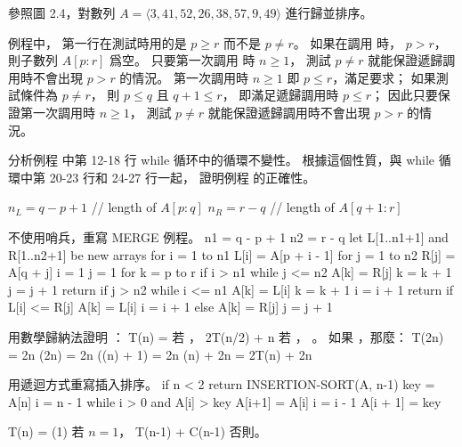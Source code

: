 \startsection[
  title={Designing algorithms},
]

\startEXERCISE
參照圖 2.4，對數列 $A=\langle 3,41,52,26,38,57,9,49\rangle$ 進行歸並排序。
\stopEXERCISE
\startANSWER
\externalfigure[output/e2_3_1-1]
\stopANSWER

\startEXERCISE
{} 例程中，
第一行在測試時用的是 $p\ge r$ 而不是 $p\ne r$。
如果在調用  時， $p>r$，
則子數列 $A[p:r]$ 爲空。
只要第一次調用  時 $n\ge 1$，
測試 $p\ne r$ 就能保證遞歸調用時不會出現 $p>r$ 的情況。
\stopEXERCISE
\startANSWER
第一次調用時 $n\ge 1$ 即 $p\le r$，滿足要求；
如果測試條件為 $p\ne r$，
則 $p\le q$ 且 $q+1\le r$，
即滿足遞歸調用時 $p\le r$；
因此只要保證第一次調用時 $n\ge 1$，
測試 $p\ne r$ 就能保證遞歸調用時不會出現 $p>r$ 的情況。
\stopANSWER

\startEXERCISE
分析例程  中第 12-18 行 while 循环中的循環不變性。
根據這個性質，與 while 循環中第 20-23 行和 24-27 行一起，
證明例程  的正確性。

\startCLRS
$n_L = q - p + 1$	// length of $A[p:q]$
$n_R = r - q$		// length of $A[q + 1 : r]$
\stopCLRS
\stopEXERCISE
\startANSWER
\stopANSWER

\startEXERCISE
不使用哨兵，重寫 MERGE 例程。
\stopEXERCISE
\startANSWER
\startCLRS
n1 = q - p + 1
n2 = r - q
let L[1..n1+1] and R[1..n2+1] be new arrays
for i = 1 to n1
	L[i] = A[p + i - 1]
for j = 1 to n2
	R[j] = A[q + j]
i = 1
j = 1
for k = p to r
	if i > n1
		while j <= n2
			A[k] = R[j]
			k = k + 1
			j = j + 1
		return
	if j > n2
		while i <= n1
			A[k] = L[i]
			k = k + 1
			i = i + 1
		return
	if L[i] <= R[j]
		A[k] = L[i]
		i = i + 1
	else A[k] = R[j]
		j = j + 1
\stopCLRS
\stopANSWER

\startEXERCISE
用數學歸納法證明 ：
\startformula
T(n) = \startmathcases
{}		\NC 若 ， \NR
\NC 2T(n/2) + n	\NC 若 ， 。 \NR
\stopmathcases
\stopformula
\stopEXERCISE
\startANSWER
如果 ，那麼：
\startformula\startalign
\NC T(2n)	\NC = 2n \lg(2n) \NR
\NC		\NC = 2n (\lg(n) + 1) \NR
\NC		\NC = 2n \lg(n) + 2n \NR
\NC		\NC = 2T(n) + 2n \NR
\stopalign\stopformula
\stopANSWER

\startEXERCISE
用遞迴方式重寫插入排序。
\stopEXERCISE
\startANSWER
{}
\startCLRS
if n < 2
	return
INSERTION-SORT(A, n-1)
key = A[n]
i = n - 1
while i > 0 and A[i] > key
	A[i+1] = A[i]
	i = i - 1
A[i + 1] = key
\stopCLRS

\startformula
T(n) = \startmathcases
\NC \Theta(1)		\NC 若 $n = 1$， \NR
\NC T(n-1) + C(n-1)	\NC 否則。 \NR
\stopmathcases
\stopformula
\stopANSWER

